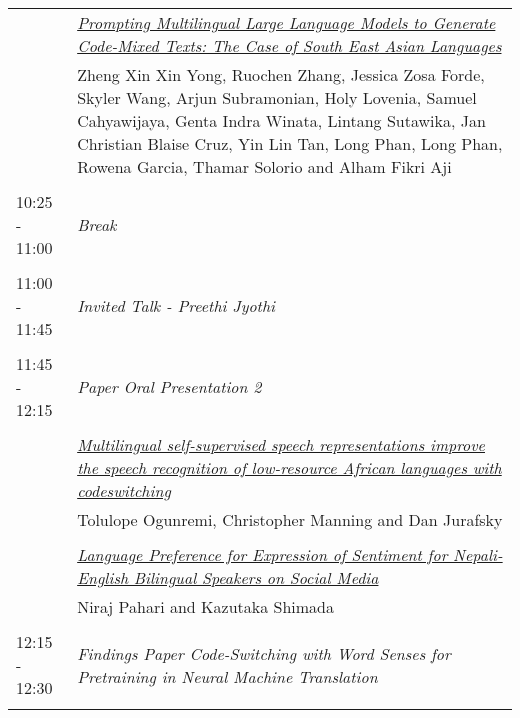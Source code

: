 \documentclass[11pt,oneside]{book}
\begin{document}
\begin{tabular}{p{24mm}p{124mm}}
                      & \hyperlink{page.43}{\emph{Prompting Multilingual Large Language Models to Generate Code-Mixed Texts: The Case of South East Asian Languages}}\\
        & Zheng Xin Xin Yong\index{Yong}, Ruochen Zhang\index{Zhang}, Jessica Zosa Forde\index{Forde}, Skyler Wang\index{Wang}, Arjun Subramonian\index{Subramonian}, Holy Lovenia\index{Lovenia}, Samuel Cahyawijaya\index{Cahyawijaya}, Genta Indra Winata\index{Winata}, Lintang Sutawika\index{Sutawika}, Jan Christian Blaise Cruz\index{Cruz}, Yin Lin Tan\index{Tan}, Long Phan\index{Phan}, Long Phan\index{Phan}, Rowena Garcia\index{Garcia}, Thamar Solorio\index{Solorio} and Alham Fikri Aji\index{Aji}\\\\
                      10:25 - 11:00 & \emph{Break}\\\\
      
                      11:00 - 11:45 & \emph{Invited Talk - Preethi Jyothi}\\\\
      
                      11:45 - 12:15 & \emph{Paper Oral Presentation 2}\\\\
      
                
                      & \hyperlink{page.83}{\emph{Multilingual self-supervised speech representations improve the speech recognition of low-resource African languages with codeswitching}}\\
        & Tolulope Ogunremi\index{Ogunremi}, Christopher Manning\index{Manning} and Dan Jurafsky\index{Jurafsky}\\\\
                
                      & \hyperlink{page.23}{\emph{Language Preference for Expression of Sentiment for Nepali-English Bilingual Speakers on Social Media}}\\
        & Niraj Pahari\index{Pahari} and Kazutaka Shimada\index{Shimada}\\\\
                      12:15 - 12:30 & \emph{Findings Paper Code-Switching with Word Senses for Pretraining in Neural Machine Translation}\\\\
      
              \end{tabular}
    \newpage
\end{document}
